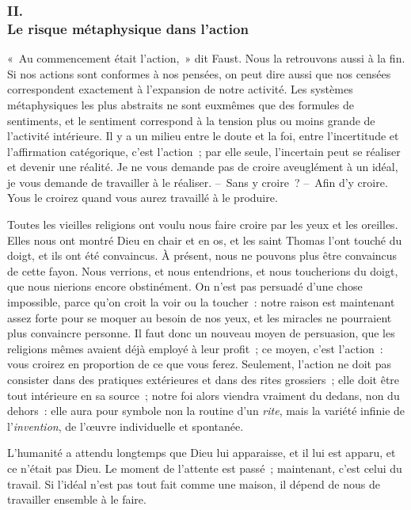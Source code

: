 \documentclass[french,twoside]{book} %
\begin{document}
\subsubsection[{II. Le risque métaphysique dans l’action}]{II. \\
Le risque métaphysique dans l’action}
\noindent « Au commencement était l’action, » dit Faust. Nous la retrouvons aussi à la fin. Si nos actions sont conformes à nos pensées, on peut dire aussi que nos censées correspondent exactement à l’expansion de notre activité. Les systèmes métaphysiques les plus abstraits ne sont euxmêmes que des formules de sentiments, et le sentiment correspond à la tension plus ou moins grande de l’activité intérieure. Il y a un milieu entre le doute et la foi, entre l’incertitude et l’affirmation catégorique, c’est l’action ; par elle seule, l’incertain peut se réaliser et devenir une réalité. Je ne vous demande pas de croire aveuglément à un idéal, je vous demande de travailler à le réaliser. – Sans y croire ? – Afin d’y croire. Yous le croirez quand vous aurez travaillé à le produire.\par
Toutes les vieilles religions ont voulu nous faire croire par les yeux et les oreilles. Elles nous ont montré Dieu en chair et en os, et les saint Thomas l’ont touché du doigt, et ils ont été convaincus. À présent, nous ne pouvons plus être convaincus de cette fayon. Nous verrions, et nous entendrions, et nous toucherions du doigt, que nous nierions encore obstinément. On n’est pas persuadé d’une chose impossible, parce qu’on croit la voir ou la toucher : notre raison est maintenant assez forte pour se moquer au besoin de nos yeux, et les miracles ne pourraient plus convaincre personne. Il faut donc un nouveau moyen de persuasion, que les religions mêmes avaient déjà employé à leur profit ; ce moyen, c’est l’action : vous croirez en proportion de ce que vous ferez. Seulement, l’action ne doit pas consister dans des pratiques extérieures et dans des rites grossiers ; elle doit être tout intérieure en sa source ; notre foi alors viendra vraiment du dedans, non du dehors : elle aura pour symbole non la routine d’un \emph{rite}, mais la variété infinie de l’\emph{invention}, de l’œuvre individuelle et spontanée.\par
L’humanité a attendu longtemps que Dieu lui apparaisse, et il lui est apparu, et ce n’était pas Dieu. Le moment de l’attente est passé ; maintenant, c’est celui du travail. Si l’idéal n’est pas tout fait comme une maison, il dépend de nous de travailler ensemble à le faire.\par
\end{document}
